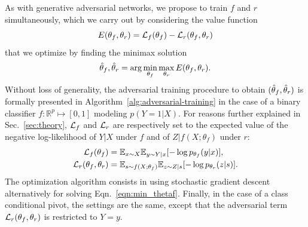 \documentclass{article}
\theoremstyle{plain}
\begin{document}
As with generative adversarial networks, we propose to
train $f$ and $r$ simultaneously, which we carry out by considering
the value function
\begin{equation}
    E(\theta_f, \theta_r) = {\cal L}_f(\theta_f) - {\cal L}_r(\theta_f, \theta_r)
\end{equation}
that we optimize by finding the minimax solution
\begin{equation}\label{eqn:min_thetaf}
    \smash{\hat\theta_f, \hat\theta_r} = \arg \min_{\theta_f} \max_{\theta_r} E(\theta_f, \theta_r).
\end{equation}
Without loss of generality, the adversarial training procedure to obtain
$(\smash{\hat\theta_f}, \smash{\hat\theta_r})$ is formally presented in
Algorithm~\ref{alg:adversarial-training} in the case of a binary classifier $f :
\mathbb{R}^p \mapsto [0,1]$ modeling $p(Y=1|X)$. For reasons further explained
in Sec.~\ref{sec:theory}, ${\cal L}_f$ and ${\cal L}_r$  are respectively set to the
expected value of the
negative log-likelihood of $Y|X$ under $f$ and of $Z|f(X;\theta_f)$ under
$r$:
\begin{align}
    {\cal L}_f(\theta_f) &= \mathbb{E}_{x \sim X}  \mathbb{E}_{y \sim Y|x} [ -\log p_{\theta_f} (y|x) ], \\
    {\cal L}_r(\theta_f, \theta_r) &= \mathbb{E}_{s \sim f(X;\theta_f)}  \mathbb{E}_{z \sim Z|s} [-\log p_{\theta_r} (z|s)].
\end{align}
The optimization algorithm consists in using stochastic gradient descent
alternatively for solving Eqn.~\ref{eqn:min_thetaf}.
Finally, in the case of a class conditional pivot, the settings are the
same, except that the adversarial term ${\cal L}_r(\theta_f, \theta_r)$ is restricted to $Y=y$.
\end{document}
